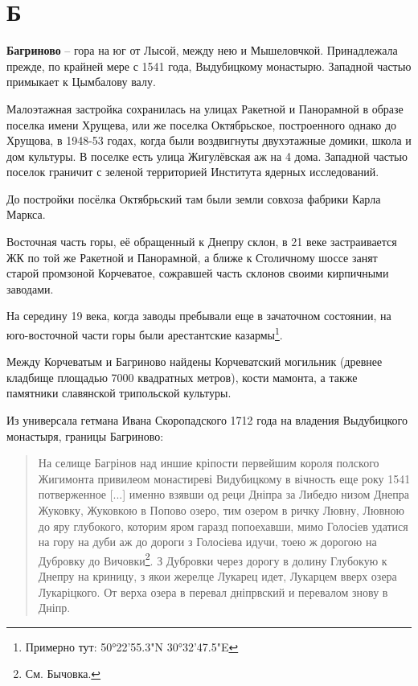 \chapter*{Б}




\textbf{Багриново} – гора на юг от Лысой, между нею и Мышеловчкой. Принадлежала прежде, по крайней мере с 1541 года, Выдубицкому монастырю. Западной частью примыкает к Цымбалову валу.

Малоэтажная застройка сохранилась на улицах Ракетной и Панорамной в образе поселка имени Хрущева, или же поселка Октябрьское, построенного однако до Хрущова, в 1948-53 годах, когда были воздвигнуты двухэтажные домики, школа и дом культуры. В поселке есть улица Жигулёвская аж на 4 дома. Западной частью поселок граничит с зеленой территорией Института ядерных исследований.

До постройки посёлка Октябрьский там были земли совхоза фабрики Карла Маркса.

Восточная часть горы, её обращенный к Днепру склон, в 21 веке застраивается ЖК по той же Ракетной и Панорамной, а ближе к Столичному шоссе занят старой промзоной Корчеватое, сожравшей часть склонов своими кирпичными заводами.

На середину 19 века, когда заводы пребывали еще в зачаточном состоянии, на юго-восточ\-ной части горы были арестантские казармы\footnote{Примерно тут: 50°22'55.3"N 30°32'47.5"E}.

Между Корчеватым и Багриново найдены Корчеватский могильник (древнее кладбище площадью 7000 квадратных метров), кости мамонта, а также памятники славянской трипольской культуры.

Из универсала гетмана Ивана Скоропадского 1712 года на владения Выдубицкого монастыря, границы Багриново:

\begin{quotation}
На селище Багрінов над иншие кріпости первейшим короля полского Жигимонта привилеом монастиреві Видубицкому в вічность еще року 1541 потверженное [...] именно взявши од реци Дніпра за Либедю низом Днепра Жуковку, Жуковкою в Попово озеро, тим озером в ричку Лювну, Лювною до яру глубокого, которим яром гаразд попоехавши, мимо Голосіев удатися на гору на дуби аж до дороги з Голосіева идучи, тоею ж дорогою на Дубровку до Вичовки\footnote{См. Бычовка.}. З Дубровки через дорогу в долину Глубокую к Днепру на криницу, з якои жерелце Лукарец идет, Лукарцем вверх озера Лукаріцкого. От верха озера в перевал дніпрвский и перевалом знову в Дніпр.\end{quotation}

